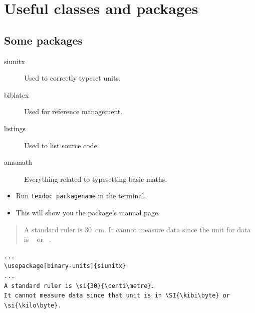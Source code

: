 \section{Useful classes and packages}

\subsection{Some packages}

\begin{frame}
  \begin{description}
    \item[siunitx] Used to correctly typeset units.

    \item[biblatex] Used for reference management.

    \item[listings] Used to list source code.

    \item[amsmath] Everything related to typesetting basic maths.
  \end{description}

  \pause

  \begin{remark}
    \begin{itemize}
      \item Run \lstinline{texdoc packagename} in the terminal.
      \item This will show you the package's manual page.
    \end{itemize}
  \end{remark}
\end{frame}

\begin{frame}[fragile]
  \begin{example}
    \begin{quote}
      A standard ruler is \SI{30}{\centi\metre}.
      It cannot measure data since the unit for data is \si{\kibi\byte} or 
      \si{\kilo\byte}.
    \end{quote}
  \end{example}

  \pause

  \begin{example}
    \begin{lstlisting}
...
\usepackage[binary-units]{siunitx}
...
A standard ruler is \si{30}{\centi\metre}.
It cannot measure data since that unit is in \SI{\kibi\byte} or 
\si{\kilo\byte}.
    \end{lstlisting}
  \end{example}

\end{frame}


